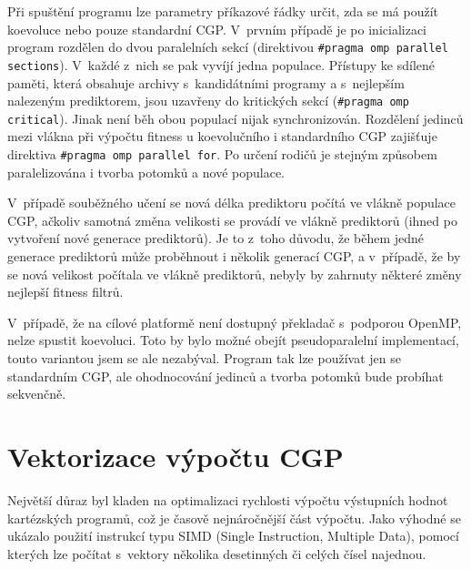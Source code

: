 Při spuštění programu lze parametry příkazové řádky určit, zda se má použít koevoluce nebo pouze standardní CGP. V~prvním případě je po inicializaci program rozdělen do dvou paralelních sekcí (direktivou \texttt{\#pragma omp parallel sections}). V~každé z~nich se pak vyvíjí jedna populace. Přístupy ke sdílené paměti, která obsahuje archivy s~kandidátními programy a s~nejlepším nalezeným prediktorem, jsou uzavřeny do kritických sekcí (\texttt{\#pragma omp critical}). Jinak není běh obou populací nijak synchronizován. Rozdělení jedinců mezi vlákna při výpočtu fitness u koevolučního i standardního CGP zajišťuje direktiva \texttt{\#pragma omp parallel for}. Po určení rodičů je stejným způsobem paralelizována i tvorba potomků a nové populace.

V~případě souběžného učení se nová délka prediktoru počítá ve vlákně populace CGP, ačkoliv samotná změna velikosti se provádí ve vlákně prediktorů (ihned po vytvoření nové generace prediktorů). Je to z~toho důvodu, že během jedné generace prediktorů může proběhnout i několik generací CGP, a v~případě, že by se nová velikost počítala ve vlákně prediktorů, nebyly by zahrnuty některé změny nejlepší fitness filtrů.

V~případě, že na cílové platformě není dostupný překladač s~podporou OpenMP, nelze spustit koevoluci. Toto by bylo možné obejít pseudoparalelní implementací, touto variantou jsem se ale nezabýval. Program tak lze používat jen se standardním CGP, ale ohodnocování jedinců a tvorba potomků bude probíhat sekvenčně.


\section{Vektorizace výpočtu CGP}
\label{secImplVectorization}

Největší důraz byl kladen na optimalizaci rychlosti výpočtu výstupních hodnot kartézských programů, což je časově nejnáročnější část výpočtu. Jako výhodné se ukázalo použití  instrukcí typu SIMD (Single Instruction, Multiple Data), pomocí kterých lze počítat s~vektory několika desetinných či celých čísel najednou.


